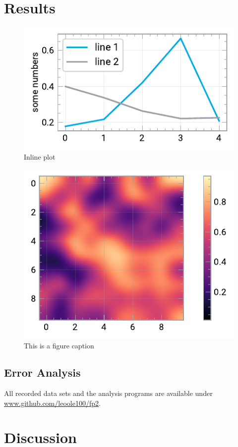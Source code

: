 \documentclass[
    parskip=half, 
    twoside=false,
    twocolumn=true
]{scrarticle}
\begin{document}
\section{Results}
\begin{figure}[H]
    \centering
    \includegraphics{fig/2024-10-01 line plot.pdf}
    \caption{Inline plot}
\end{figure}
\begin{figure}
    \centering \includegraphics{fig/2024-10-01 img plot.pdf}
    \caption{This is a figure caption}
\end{figure}
\blindtext[3]

\subsection{Error Analysis}
\blindtext

All recorded data sets and the analysis programs are available under \url{www.github.com/leoole100/fp2}.

\pagebreak
\section{Discussion}
\blindtext
\end{document}
